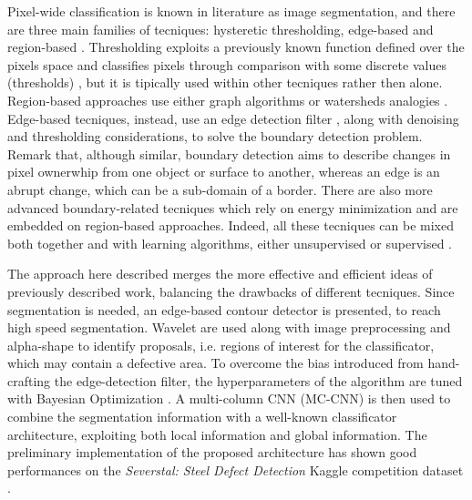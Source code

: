     \par{
        Pixel-wide classification is known in literature as image segmentation, and there are three main families of tecniques: hysteretic thresholding, edge-based and region-based \cite{ieee:7684170}. Thresholding exploits a previously known function defined over the pixels space and classifies pixels through comparison with some discrete values (thresholds) \cite{ieee:4310039}, but it is tipically used within other tecniques rather then alone. Region-based approaches use either graph algorithms \cite{ieee:6205760, ieee:868688} or watersheds analogies \cite{ieee:87344}. Edge-based tecniques, instead, use an edge detection filter \cite{Klette:2014:CCV:2584519, googlescholar:kovesiphase, researchgate:phase}, along with denoising and thresholding considerations, to solve the boundary detection problem. Remark that, although similar, boundary detection aims to describe changes in pixel ownerwhip from one object or surface to another, whereas an edge is an abrupt change, which can be a sub-domain of a border. There are also more advanced boundary-related tecniques \cite{springer:Kass1988} which rely on energy minimization and are embedded on region-based approaches. Indeed, all these tecniques can be mixed both together and with learning algorithms, either unsupervised \cite{ieee:7684170} or supervised \cite{ieee:1273918}.
    }
    \par{
        The approach here described merges the more effective and efficient ideas of previously described work, balancing the drawbacks of different tecniques. Since segmentation is needed, an edge-based contour detector is presented, to reach high speed segmentation. Wavelet are used along with image preprocessing and alpha-shape \cite{springer:10.1007/11907350_46} to identify proposals, i.e. regions of interest for the classificator, which may contain a defective area. To overcome the bias introduced from hand-crafting the edge-detection filter, the hyperparameters of the algorithm are tuned with Bayesian Optimization \cite{arXiv:2018arXiv180702811F, arXiv:2012arXiv1206.2944S, rasmussen:williams:2006}.
        A multi-column CNN (MC-CNN) \cite{ieee:6248110} is then used to combine the segmentation information with a well-known classificator architecture, exploiting both local information and global information. The preliminary implementation of the proposed architecture has shown good performances on the \emph{Severstal: Steel Defect Detection} Kaggle competition dataset \cite{kaggle:severstal}.
    }